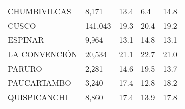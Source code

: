 \begin{tabular}{lllll}
	\cellcolor[HTML]{FF5050}CHUMBIVILCAS                           & 8,171                                                                 & 13.4                                                                             & 6.4                                                                         & 14.8                                                                                \\
	\cellcolor[HTML]{FF5050}CUSCO                                  & 141,043                                                               & 19.3                                                                             & 20.4                                                                        & 19.2                                                                                \\
	\cellcolor[HTML]{FF5050}ESPINAR                                & 9,964                                                                 & 13.1                                                                             & 14.8                                                                        & 13.1                                                                                \\
	\cellcolor[HTML]{FF5050}LA CONVENCIÓN                          & 20,534                                                                & 21.1                                                                             & 22.7                                                                        & 21.0                                                                                \\
	\cellcolor[HTML]{FF5050}PARURO                                 & 2,281                                                                 & 14.6                                                                             & 19.5                                                                        & 13.7                                                                                \\
	\cellcolor[HTML]{FF5050}PAUCARTAMBO                            & 3,240                                                                 & 17.4                                                                             & 12.8                                                                        & 18.2                                                                                \\
	\cellcolor[HTML]{FF5050}QUISPICANCHI                           & 8,860                                                                 & 17.4                                                                             & 13.9                                                                        & 17.8                                                                                \\

\end{tabular}
